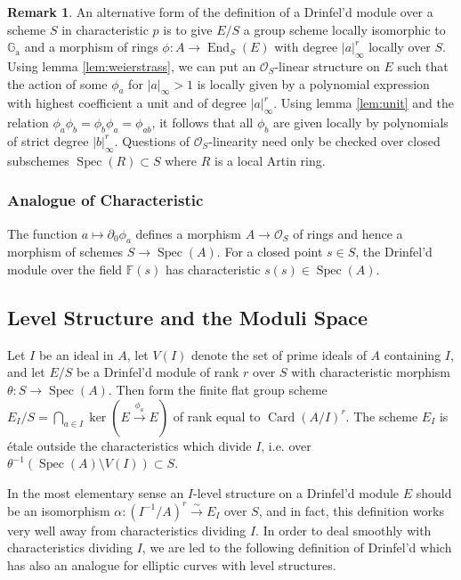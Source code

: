\documentclass[12pt,a4paper]{article}
\theoremstyle{plain}
\theoremstyle{definition}
\newtheorem{remark}{Remark}[section]
\theoremstyle{remark}
\DeclareMathOperator{\End}{End}
\DeclareMathOperator{\Spec}{Spec}
\DeclareMathOperator{\Card}{Card}
\newcommand{\bF}{\mathbb{F}}
\newcommand{\cO}{\mathcal{O}}
\newcommand{\Ga}{\mathbb{G}_\mathrm{a}}
\providecommand{\Ga}{\mathbb{G}_{\mathrm a}}
\providecommand{\cO}{\mathcal{O}}
\providecommand{\End}{\operatorname{End}}
\providecommand{\Spec}{\operatorname{Spec}}
\begin{document}
\begin{remark}
\label{rem:alternative}
An alternative form of the definition of a Drinfel'd module over a scheme $S$ in characteristic $p$ is to give $E/S$ a group scheme locally isomorphic to $\Ga$ and a morphism of rings $\phi: A \to \End_S(E)$ with degree $|a|_\infty^r$ locally over $S$. Using lemma \eqref{lem:weierstrass}, we can put an $\cO_S$-linear structure on $E$ such that the action of some $\phi_a$ for $|a|_\infty > 1$ is locally given by a polynomial expression with highest coefficient a unit and of degree $|a|_\infty^r$. Using lemma \eqref{lem:unit} and the relation $\phi_a \phi_b = \phi_b \phi_a = \phi_{ab}$, it follows that all $\phi_b$ are given locally by polynomials of strict degree $|b|_\infty^r$. Questions of $\cO_S$-linearity need only be checked over closed subschemes $\Spec(R) \subset S$ where $R$ is a local Artin ring.
\end{remark}

\subsubsection*{Analogue of Characteristic}

The function $a \mapsto \partial_0 \phi_a$ defines a morphism $A \to \cO_S$ of rings and hence a morphism of schemes $S \to \Spec(A)$. For a closed point $s \in S$, the Drinfel'd module over the field $\bF(s)$ has characteristic $s(s) \in \Spec(A)$.

\subsection{Level Structure and the Moduli Space}
\label{sec:level}

Let $I$ be an ideal in $A$, let $V(I)$ denote the set of prime ideals of $A$ containing $I$, and let $E/S$ be a Drinfel'd module of rank $r$ over $S$ with characteristic morphism $\theta: S \to \Spec(A)$. Then form the finite flat group scheme $E_I/S = \bigcap_{a \in I} \ker(E \xrightarrow{\phi_a} E)$ of rank equal to $\Card(A/I)^r$. The scheme $E_I$ is \'etale outside the characteristics which divide $I$, i.e. over $\theta^{-1}(\Spec(A) \setminus V(I)) \subset S$.

In the most elementary sense an $I$-level structure on a Drinfel'd module $E$ should be an isomorphism $\alpha: (I^{-1}/A)^r \xrightarrow{\sim} E_I$ over $S$, and in fact, this definition works very well away from characteristics dividing $I$. In order to deal smoothly with characteristics dividing $I$, we are led to the following definition of Drinfel'd which has also an analogue for elliptic curves with level structures.
\end{document}
